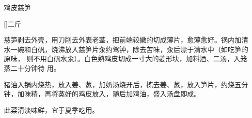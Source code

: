 %
%
%
%
%
%
%
\begin{recipe}{鸡皮慈笋}

\ingredients

[\footnotemark]{二斤}

\preparation

\step 慈笋剥去外壳，用刀削去外表老茎，把前端较嫩的切成薄片，愈薄愈好。锅内加清
水一碗和白矾，烧沸放入慈笋片汆约驾钟，除去苦味，汆后漂于清水中（如吃笋的原味，
则不用白矾水汆）。白色熟鸡皮切成一寸大的菱形块，加料酒、二汤，入笼蒸二十分钟待
用。

\step 猪油入锅内烧热，放入姜、葱，加奶汤烧开后，拣去姜、葱，放入笋片，约烧五分
钟，加味精，再将蒸好的鸡皮放入，随后加鸡油，盛入汤盘即成。

\features

此菜清淡味鲜，宜于夏季吃用。


\end{recipe}

